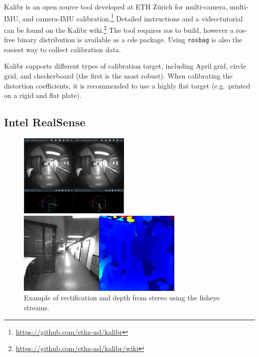 \documentclass[11pt, letterpaper, twoside]{article}
\begin{document}
Kalibr is an open source tool developed at ETH Zürich for multi-camera,
multi-IMU, and camera-IMU
calibration.\footnote{\label{note:kalibr}\url{https://github.com/ethz-asl/kalibr}} Detailed
instructions and a video-tutorial can be found on the Kalibr
wiki.\footnote{\url{https://github.com/ethz-asl/kalibr/wiki}} The tool requires
\gls{ros} to build, however a \gls{ros}-free binary distribution is available
as a \gls{cde} package. Using \texttt{rosbag} is also the easiest way to
collect calibration data.

Kalibr supports different types of calibration target, including April grid,
circle grid, and checkerboard (the first is the most robust). When calibrating
the distortion coefficients, it is recommended to use a highly flat target
(e.g.\ printed on a rigid and flat plate).

\subsection{Intel RealSense}\label{sec:realsense}

\begin{figure}[tb]
    \centering
    \begin{minipage}[t]{.49\textwidth}
        \centering
        \includegraphics[height=4cm]{t265_raw.png}
        \caption{%
            Raw data from the T265.
        }\label{fig:t265_raw}
    \end{minipage}%
    \begin{minipage}[t]{.49\textwidth}
        \centering
        \includegraphics[height=4cm]{t265_depth.png}
        \caption{%
            Example of rectification and depth from stereo using the
            fisheye streams.
        }\label{fig:t265_depth}
    \end{minipage}%
\end{figure}
\end{document}
